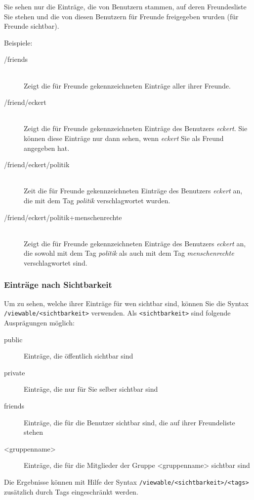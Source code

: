 Sie sehen nur die Einträge, die von Benutzern stammen, auf deren Freundesliste Sie stehen und die von diesen Benutzern für Freunde freigegeben wurden (für Freunde sichtbar).

Beispiele:
\begin{description}
    \item [/friends] \hfill \\
    Zeigt die für Freunde gekennzeichneten Einträge aller ihrer Freunde.
    \item [/friend/eckert] \hfill \\
    Zeigt die für Freunde gekennzeichneten Einträge des Benutzers \textit{eckert}. Sie können diese Einträge nur dann sehen, wenn \textit{eckert} Sie als Freund angegeben hat.
    \item [/friend/eckert/politik] \hfill \\
    Zeit die für Freunde gekennzeichneten Einträge des Benutzers \textit{eckert} an, die mit dem Tag \textit{politik} verschlagwortet wurden. 
    \item [/friend/eckert/politik+menschenrechte] \hfill \\
    Zeigt die für Freunde gekennzeichneten Einträge des Benutzers \textit{eckert} an, die sowohl mit dem Tag \textit{politik} als auch mit dem Tag \textit{menschenrechte} verschlagwortet sind. 
\end{description}

\subsubsection{Einträge nach Sichtbarkeit}
\label{sss:nachSichtbarkeit}
Um zu sehen, welche ihrer Einträge für wen sichtbar sind, können Sie die Syntax \texttt{/viewable/<sichtbarkeit>} verwenden. Als \texttt{<sichtbarkeit>} sind folgende Ausprägungen möglich:
\begin{description}
  \item[public] Einträge, die öffentlich sichtbar sind
	\item[private] Einträge, die nur für Sie selber sichtbar sind
	\item[friends] Einträge, die für die Benutzer sichtbar sind, die auf ihrer Freundeliste stehen
	\item[<gruppenname>] Einträge, die für die Mitglieder der Gruppe <gruppenname> sichtbar sind
\end{description}  

Die Ergebnisse können mit Hilfe der Syntax \texttt{/viewable/<sichtbarkeit>/<tags>} zusätzlich durch Tags eingeschränkt werden. 

